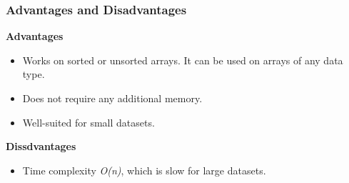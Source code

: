\subsubsection{Advantages and Disadvantages}

\textbf{Advantages}

\begin{itemize}
  \item Works on sorted or unsorted arrays. It can be used on arrays of any data type.
  \item Does not require any additional memory.
  \item Well-suited for small datasets.
\end{itemize}

\textbf{Dissdvantages}

\begin{itemize}
  \item Time complexity \textit{O(n)}, which is slow for large datasets.
\end{itemize}
